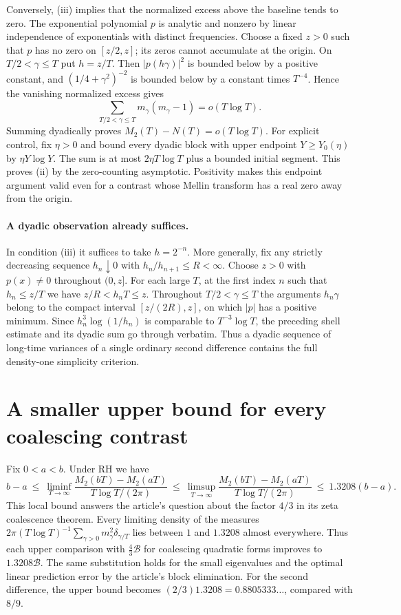 \documentclass[11pt]{article}
\begin{document}
Conversely, (iii) implies that the normalized excess above the baseline tends to zero. The exponential polynomial $p$ is analytic and nonzero by linear independence of exponentials with distinct frequencies. Choose a fixed $z>0$ such that $p$ has no zero on $[z/2,z]$; its zeros cannot accumulate at the origin. On $T/2<\gamma\le T$ put $h=z/T$. Then $|p(h\gamma)|^2$ is bounded below by a positive constant, and $(1/4+\gamma^2)^{-2}$ is bounded below by a constant times $T^{-4}$. Hence the vanishing normalized excess gives
\[
 \sum_{T/2<\gamma\le T}m_\gamma(m_\gamma-1)=o(T\log T).
\]
Summing dyadically proves $M_2(T)-N(T)=o(T\log T)$. For explicit control, fix $\eta>0$ and bound every dyadic block with upper endpoint $Y\ge Y_0(\eta)$ by $\eta Y\log Y$. The sum is at most $2\eta T\log T$ plus a bounded initial segment. This proves (ii) by the zero-counting asymptotic. Positivity makes this endpoint argument valid even for a contrast whose Mellin transform has a real zero away from the origin.

\paragraph{A dyadic observation already suffices.}
In condition (iii) it suffices to take $h=2^{-n}$. More generally, fix any strictly decreasing sequence $h_n\downarrow0$ with $h_n/h_{n+1}\le R<\infty$. Choose $z>0$ with $p(x)\ne0$ throughout $(0,z]$. For each large $T$, at the first index $n$ such that $h_n\le z/T$ we have $z/R<h_nT\le z$. Throughout $T/2<\gamma\le T$ the arguments $h_n\gamma$ belong to the compact interval $[z/(2R),z]$, on which $|p|$ has a positive minimum. Since $h_n^3\log(1/h_n)$ is comparable to $T^{-3}\log T$, the preceding shell estimate and its dyadic sum go through verbatim. Thus a dyadic sequence of long-time variances of a single ordinary second difference contains the full density-one simplicity criterion.
\section{A smaller upper bound for every coalescing contrast}
\label{sec:local-pair}
Fix $0<a<b$. Under RH we have
\[
  b-a\ \le\ \liminf_{T\to\infty}
  \frac{M_2(bT)-M_2(aT)}{T\log T/(2\pi)}
  \ \le\ \limsup_{T\to\infty}
  \frac{M_2(bT)-M_2(aT)}{T\log T/(2\pi)}
  \ \le\ 1.3208(b-a).
\]
This local bound answers the article's question about the factor $4/3$ in its zeta coalescence theorem. Every limiting density of the measures
$2\pi(T\log T)^{-1}\sum_{\gamma>0}m_\gamma^2\delta_{\gamma/T}$
lies between $1$ and $1.3208$ almost everywhere. Thus each upper comparison with $\tfrac43\mathcal B$ for coalescing quadratic forms improves to $1.3208\mathcal B$. The same substitution holds for the small eigenvalues and the optimal linear prediction error by the article's block elimination. For the second difference, the upper bound becomes $(2/3)1.3208=0.8805333\ldots$, compared with $8/9$.
\end{document}
